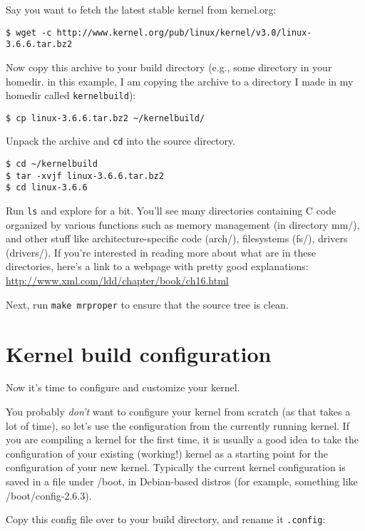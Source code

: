\documentclass{article}
\begin{document}
Say you want to fetch the latest stable kernel from kernel.org: 

\begin{verbatim}$ wget -c http://www.kernel.org/pub/linux/kernel/v3.0/linux-3.6.6.tar.bz2\end{verbatim}

Now copy this archive to your build directory (e.g., some directory in your homedir. in this example, I am copying the archive to a directory I made in my homedir called \texttt{kernelbuild}):

\begin{verbatim}$ cp linux-3.6.6.tar.bz2 ~/kernelbuild/\end{verbatim}

Unpack the archive and \texttt{cd} into the source directory.

\begin{verbatim}
$ cd ~/kernelbuild
$ tar -xvjf linux-3.6.6.tar.bz2
$ cd linux-3.6.6
\end{verbatim}

Run \texttt{ls} and explore for a bit. 
You'll see many directories containing C code organized by various functions such as memory management (in directory mm/), and other stuff like architecture-specific code (arch/), filesystems (fs/), drivers (drivers/). 
If you're interested in reading more about what are in these directories, here's a link to a webpage with pretty good explanations: \url{http://www.xml.com/ldd/chapter/book/ch16.html}


Next, run \texttt{make mrproper} to ensure that the source tree is clean.

\section{Kernel build configuration} 

Now it's time to configure and customize your kernel. 

You probably {\it don't} want to configure your kernel from scratch (as that takes a lot of time), so let's use the configuration from the currently running kernel.
If you are compiling a kernel for the first time, it is usually a good idea to take the configuration of your existing (working!) kernel as a starting point for the configuration of your new kernel. 
Typically the current kernel configuration is saved in a file under /boot, in Debian-based distros (for example, something like /boot/config-2.6.3). 

Copy this config file over to your build directory, and rename it \texttt{.config}:
\end{document}
